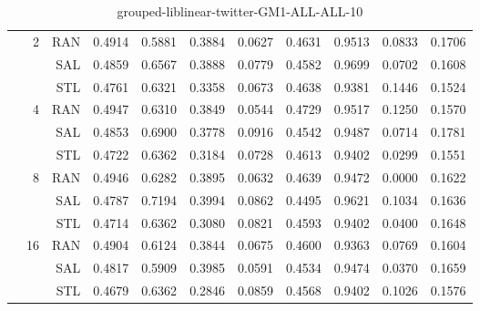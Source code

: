 \begin{center}
\begin{table}[htbp]
\begin{center}
\begin{tabular}{ | r | r | r | r | r | r | r | r | r | r | r |}
 & \multirow{3}{*}{2} & RAN & 0.4914 & 0.5881 & 0.3884 & 0.0627 & 0.4631 & 0.9513 & 0.0833 & 0.1706\\ \cline{3-11}
 &   & SAL & 0.4859 & 0.6567 & 0.3888 & 0.0779 & 0.4582 & 0.9699 & 0.0702 & 0.1608\\ \cline{3-11}
 &   & STL & 0.4761 & 0.6321 & 0.3358 & 0.0673 & 0.4638 & 0.9381 & 0.1446 & 0.1524\\ \cline{2-11}
 & \multirow{3}{*}{4} & RAN & 0.4947 & 0.6310 & 0.3849 & 0.0544 & 0.4729 & 0.9517 & 0.1250 & 0.1570\\ \cline{3-11}
 &   & SAL & 0.4853 & 0.6900 & 0.3778 & 0.0916 & 0.4542 & 0.9487 & 0.0714 & 0.1781\\ \cline{3-11}
 &   & STL & 0.4722 & 0.6362 & 0.3184 & 0.0728 & 0.4613 & 0.9402 & 0.0299 & 0.1551\\ \cline{2-11}
 & \multirow{3}{*}{8} & RAN & 0.4946 & 0.6282 & 0.3895 & 0.0632 & 0.4639 & 0.9472 & 0.0000 & 0.1622\\ \cline{3-11}
 &   & SAL & 0.4787 & 0.7194 & 0.3994 & 0.0862 & 0.4495 & 0.9621 & 0.1034 & 0.1636\\ \cline{3-11}
 &   & STL & 0.4714 & 0.6362 & 0.3080 & 0.0821 & 0.4593 & 0.9402 & 0.0400 & 0.1648\\ \cline{2-11}
 & \multirow{3}{*}{16} & RAN & 0.4904 & 0.6124 & 0.3844 & 0.0675 & 0.4600 & 0.9363 & 0.0769 & 0.1604\\ \cline{3-11}
 &   & SAL & 0.4817 & 0.5909 & 0.3985 & 0.0591 & 0.4534 & 0.9474 & 0.0370 & 0.1659\\ \cline{3-11}
 &   & STL & 0.4679 & 0.6362 & 0.2846 & 0.0859 & 0.4568 & 0.9402 & 0.1026 & 0.1576\\ \cline{2-11}
\hline
\end{tabular}
\caption{grouped-liblinear-twitter-GM1-ALL-ALL-10}
\end{center}
 \end{table}
\end{center}

